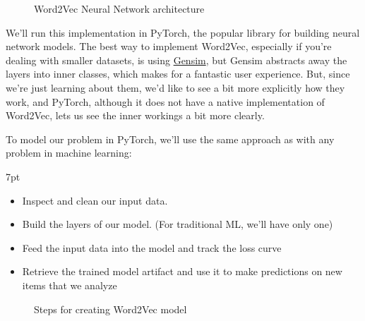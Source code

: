 \documentclass[11pt, table]{diazessay} %
\newenvironment{formal}{%
  \def\FrameCommand{%
	\hspace{1pt}%
	{\color{w_lightblue}\vrule width 2pt}%
	{\color{formalshade}\vrule width 4pt}%
	\colorbox{formalshade}%
  }%
  \MakeFramed{\advance\hsize-\width\FrameRestore}%
  \noindent\hspace{-4.55pt}%
  \begin{adjustwidth}{}{7pt}%
  \vspace{2pt}\vspace{2pt}%
}
{%
  \vspace{2pt}\end{adjustwidth}\endMakeFramed%
}
\begin{document}
\begin{sloppypar}
\begin{figure}[H]
\caption{Word2Vec Neural Network architecture}
\end{figure}

We'll run this implementation in PyTorch, the popular library for building neural network models. The best way to implement Word2Vec, especially if you're dealing with smaller datasets, is using \hyperlink{https://radimrehurek.com/gensim/}{Gensim}, but Gensim abstracts away the layers into inner classes, which makes for a fantastic user experience. But, since we're just learning about them, we'd like to see a bit more explicitly how they work, and PyTorch, although it does not have a native implementation of Word2Vec, lets us see the inner workings a bit more clearly.

To model our problem in PyTorch, we'll use the same approach as with any problem in machine learning:

\begin{formal}
\begin{itemize}
  \item Inspect and clean our input data.
  \item Build the layers of our model. (For traditional ML, we'll have only one)
  \item Feed the input data into the model and track the loss curve
  \item Retrieve the trained model artifact and use it to make predictions  on new items that we analyze
\end{itemize}
\end{formal}

\begin{figure}[H]
    	\caption{Steps for creating Word2Vec model}
  	\end{figure}
 	 

\end{sloppypar}
\end{document}
